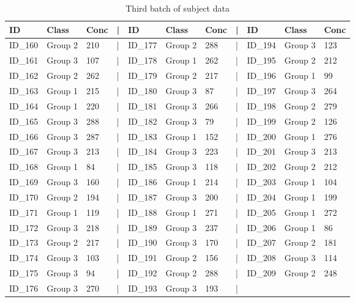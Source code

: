 \documentclass[smallextended]{svjour3}       %
\begin{document}
\begin{table}

\caption{\label{tab:show-table-3}Third batch of subject data}
\centering
\begin{tabular}[t]{lllllllllll}
\toprule
ID & Class & Conc & | & ID & Class & Conc & | & ID & Class & Conc\\
\midrule
ID\_160 & Group 2 & 210 & | & ID\_177 & Group 2 & 288 & | & ID\_194 & Group 3 & 123\\
ID\_161 & Group 3 & 107 & | & ID\_178 & Group 1 & 262 & | & ID\_195 & Group 2 & 212\\
ID\_162 & Group 2 & 262 & | & ID\_179 & Group 2 & 217 & | & ID\_196 & Group 1 & 99\\
ID\_163 & Group 1 & 215 & | & ID\_180 & Group 3 & 87 & | & ID\_197 & Group 3 & 264\\
ID\_164 & Group 1 & 220 & | & ID\_181 & Group 3 & 266 & | & ID\_198 & Group 2 & 279\\
\addlinespace
ID\_165 & Group 3 & 288 & | & ID\_182 & Group 3 & 79 & | & ID\_199 & Group 2 & 126\\
ID\_166 & Group 3 & 287 & | & ID\_183 & Group 1 & 152 & | & ID\_200 & Group 1 & 276\\
ID\_167 & Group 3 & 213 & | & ID\_184 & Group 3 & 223 & | & ID\_201 & Group 3 & 213\\
ID\_168 & Group 1 & 84 & | & ID\_185 & Group 3 & 118 & | & ID\_202 & Group 2 & 212\\
ID\_169 & Group 3 & 160 & | & ID\_186 & Group 1 & 214 & | & ID\_203 & Group 1 & 104\\
\addlinespace
ID\_170 & Group 2 & 194 & | & ID\_187 & Group 3 & 200 & | & ID\_204 & Group 1 & 199\\
ID\_171 & Group 1 & 119 & | & ID\_188 & Group 1 & 271 & | & ID\_205 & Group 1 & 272\\
ID\_172 & Group 3 & 218 & | & ID\_189 & Group 3 & 237 & | & ID\_206 & Group 1 & 86\\
ID\_173 & Group 2 & 217 & | & ID\_190 & Group 3 & 170 & | & ID\_207 & Group 2 & 181\\
ID\_174 & Group 3 & 103 & | & ID\_191 & Group 2 & 156 & | & ID\_208 & Group 3 & 114\\
\addlinespace
ID\_175 & Group 3 & 94 & | & ID\_192 & Group 2 & 288 & | & ID\_209 & Group 2 & 248\\
ID\_176 & Group 3 & 270 & | & ID\_193 & Group 3 & 193 & | &  &  & \\
\bottomrule
\end{tabular}
\end{table}
\end{document}
